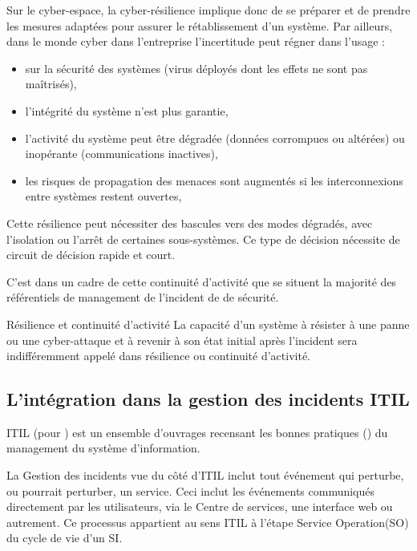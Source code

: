 Sur le cyber-espace, la cyber-résilience implique donc de se préparer et de prendre  les mesures adaptées pour assurer le rétablissement d’un système. Par  ailleurs, dans le monde cyber dans l'entreprise l’incertitude peut régner dans l'usage :
\begin{itemize}
  \item  sur la sécurité des systèmes (virus déployés dont les effets ne sont pas maîtrisés), 
   \item l’intégrité du système n’est plus garantie, 
  \item l’activité du système peut être dégradée (données corrompues ou altérées) ou inopérante (communications inactives), 
  \item les risques de propagation des menaces sont augmentés si les interconnexions entre systèmes restent ouvertes, 
    
\end{itemize}

 Cette résilience peut  nécessiter des bascules vers des modes dégradés, avec l'isolation ou l'arrêt de certaines sous-systèmes. Ce type de décision nécessite de circuit de décision rapide et court.

C'est dans un cadre de cette continuité d'activité que se situent la majorité des référentiels de management de l'incident de de sécurité.

\begin{notebox}{Résilience et continuité d'activité}
La capacité d’un système  à résister à une panne ou une cyber-attaque et à revenir à son état initial après l’incident sera indifféremment appelé dans \ecours résilience ou continuité d'activité. 
\end{notebox}


\subsection{L'intégration dans la gestion des incidents ITIL}

ITIL (pour ) est un ensemble d'ouvrages recensant les bonnes pratiques () du management du système d'information. 

La Gestion des incidents vue du côté d'ITIL  inclut tout événement qui perturbe, ou pourrait perturber, un service. Ceci inclut les événements communiqués directement par les utilisateurs, via le Centre de services, une interface web ou autrement.
Ce processus appartient au sens ITIL à l'étape Service Operation(SO) du cycle de vie d'un SI.

